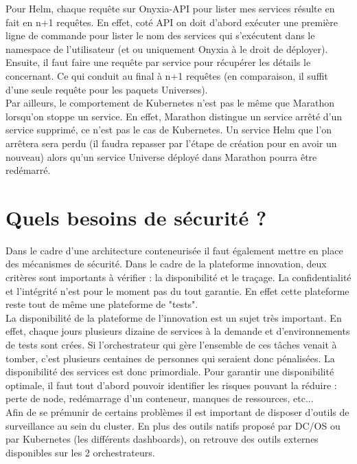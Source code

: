 \documentclass[11pt,fleqn]{book} %
\begin{document}
Pour Helm, chaque requête sur Onyxia-API pour lister mes services résulte en fait en n+1 requêtes. En effet, coté API on doit d'abord exécuter une première ligne de commande pour lister le nom des services qui s'exécutent dans le namespace de l'utilisateur (et ou uniquement Onyxia à le droit de déployer). Ensuite, il faut faire une requête par service pour récupérer les détails le concernant. Ce qui conduit au final à n+1 requêtes (en comparaison, il suffit d'une seule requête pour les paquets Universes). \\

Par ailleurs, le comportement de Kubernetes n'est pas le même que Marathon lorsqu'on stoppe un service. En effet, Marathon distingue un service arrêté d'un service supprimé, ce n'est pas le cas de Kubernetes. Un service Helm que l'on arrêtera sera perdu (il faudra repasser par l'étape de création pour en avoir un nouveau) alors qu'un service Universe déployé dans Marathon pourra être redémarré.

\section{Quels besoins de sécurité ?}
Dans le cadre d'une architecture conteneurisée il faut également mettre en place des mécanismes de sécurité. Dans le cadre de la plateforme innovation, deux critères sont importants à vérifier : la disponibilité et le traçage. La confidentialité et l'intégrité n'est pour le moment pas du tout garantie. En effet cette plateforme reste tout de même une plateforme de "tests".\\

La disponibilité de la plateforme de l’innovation est un sujet très important. En effet, chaque jours plusieurs dizaine de services à la demande et d’environnements de tests sont crées. Si l’orchestrateur qui gère l’ensemble de ces tâches venait à tomber, c’est plusieurs centaines de personnes qui seraient donc pénalisées. La disponibilité des services est donc primordiale. Pour garantir une disponibilité optimale, il faut tout d’abord pouvoir identifier les risques pouvant la réduire : perte de node, redémarrage d’un conteneur, manques de ressources, etc... \\

Afin de se prémunir de certains problèmes il est important de disposer d’outils de surveillance au sein du cluster. En plus des outils natifs proposé par DC/OS ou par Kubernetes (les différents dashboards), on retrouve des outils externes disponibles sur les 2 orchestrateurs.\\
\end{document}

